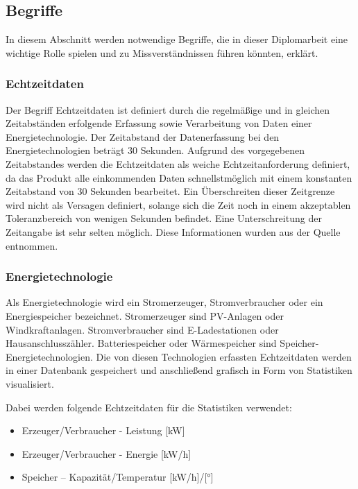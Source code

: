 \newpage
\subsection{Begriffe}
In diesem Abschnitt werden notwendige Begriffe, die in dieser Diplomarbeit eine wichtige Rolle spielen und zu Missverständnissen führen könnten, erklärt.

\subsubsection{Echtzeitdaten} \label{sec:Echtzeitdaten}
Der Begriff Echtzeitdaten ist definiert durch die regelmäßige und in gleichen Zeitabständen erfolgende Erfassung sowie Verarbeitung von Daten einer Energietechnologie. Der Zeitabstand der Datenerfassung bei den Energietechnologien beträgt 30 Sekunden. Aufgrund des vorgegebenen Zeitabstandes werden die Echtzeitdaten als weiche Echtzeitanforderung definiert, da das Produkt alle einkommenden Daten schnellstmöglich mit einem konstanten Zeitabstand von 30 Sekunden bearbeitet. Ein Überschreiten dieser Zeitgrenze wird nicht als Versagen definiert, solange sich die Zeit noch in einem akzeptablen Toleranzbereich von wenigen Sekunden befindet. Eine Unterschreitung der Zeitangabe ist sehr selten möglich. Diese Informationen wurden aus der Quelle \cite{Echtzeitdaten} entnommen.


\subsubsection{Energietechnologie} \label{sec:Energietechnologie}
Als Energietechnologie wird ein Stromerzeuger, Stromverbraucher oder ein Energiespeicher bezeichnet. Stromerzeuger sind PV-Anlagen oder Windkraftanlagen. Stromverbraucher sind E-Ladestationen oder Hausanschlusszähler. Batteriespeicher oder Wärmespeicher sind Speicher-Energietechnologien. Die von diesen Technologien erfassten Echtzeitdaten werden in einer Datenbank gespeichert und anschließend grafisch in Form von Statistiken visualisiert.

Dabei werden folgende Echtzeitdaten für die Statistiken verwendet:

\begin{itemize}
	\item Erzeuger/Verbraucher - Leistung [kW]
	\item Erzeuger/Verbraucher - Energie [kW/h]
	\item Speicher – Kapazität/Temperatur [kW/h]/[°]
\end{itemize}

